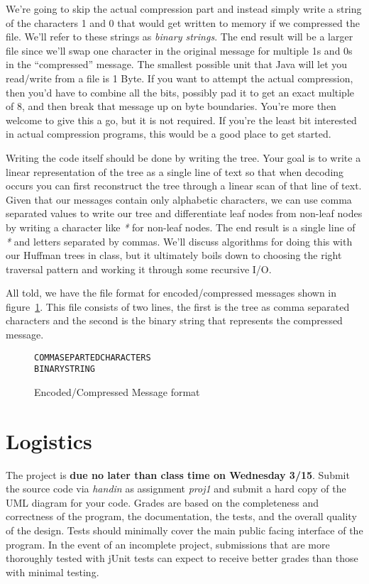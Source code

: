 \documentclass[nobib]{tufte-handout}
\begin{document}
We're going to skip the actual compression part and instead simply write a string of the characters 1 and 0 that would get written to memory if we compressed the file. We'll refer to these strings as \textit{binary strings}. The end result will be a larger file since we'll swap one character in the original message for multiple 1s and 0s in the ``compressed'' message. The smallest possible unit that Java will let you read/write from a file is 1 Byte. If you want to attempt the actual compression, then you'd have to combine all the bits, possibly pad it to get an exact multiple of 8, and then break that message up on byte boundaries. You're more then welcome to give this a go, but it is not required. If you're the least bit interested in actual compression programs, this would be a good place to get started.

Writing the code itself should be done by writing the tree. Your goal is to write a linear representation of the tree as a single line of text so that when decoding occurs you can first reconstruct the tree through a linear scan of that line of text. Given that our messages contain only alphabetic characters, we can use comma separated values to write our tree and differentiate leaf nodes from non-leaf nodes by writing a character like \textit{*} for non-leaf nodes. The end result is a single line of \textit{*} and letters separated by commas. We'll discuss algorithms for doing this with our Huffman trees in class, but it ultimately boils down to choosing the right traversal pattern and working it through some recursive I/O.

All told, we have the file format for encoded/compressed messages shown in figure~\ref{fig:encodefile}. This file consists of two lines, the first is the tree as comma separated characters and the second is the binary string that represents the compressed message.

\begin{figure}
\begin{verbatim}
COMMASEPARTEDCHARACTERS
BINARYSTRING
\end{verbatim}
\caption{Encoded/Compressed Message format}
\label{fig:encodefile}
\end{figure}

\section{Logistics}

The project is \textbf{due no later than class time on Wednesday 3/15}. Submit the source code via \textit{handin} as assignment \textit{proj1} and submit a hard copy of the UML diagram for your code. Grades are based on the completeness and correctness of the program, the documentation, the tests, and the overall quality of the design. Tests should minimally cover the main public facing interface of the program. In the event of an incomplete project, submissions that are more thoroughly tested with jUnit tests can expect to receive better grades than those with minimal testing.
\end{document}
